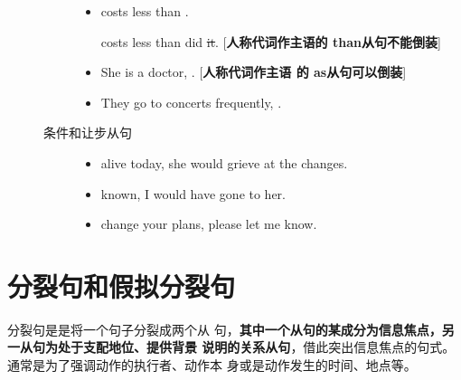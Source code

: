 \begin{description}
\begin{description}
\begin{itemize}
    \item {} costs less than .

       costs less than did \sout{it}. [\textbf{人称代词作主语的 than从句不能倒装}]

    \item She is a doctor, . [\textbf{人称代词作主语
        的 as从句可以倒装}]

    \item They go to concerts frequently, .

    \end{itemize}

  \item[条件和让步从句]
    \begin{itemize}
    \item {}  alive today, she would grieve at the changes.
    \item {}  known, I would have gone to her.
    \item {}  change your plans, please let me know.
    \end{itemize}
  \end{description}
\end{description}

\section{分裂句和假拟分裂句}
\label{subsec:cleftsen}

 分裂句是是将一个句子分裂成两个从
句，\textbf{其中一个从句的某成分为信息焦点，另一从句为处于支配地位、提供背景
  说明的关系从句}，借此突出信息焦点的句式。通常是为了强调动作的执行者、动作本
身或是动作发生的时间、地点等。


